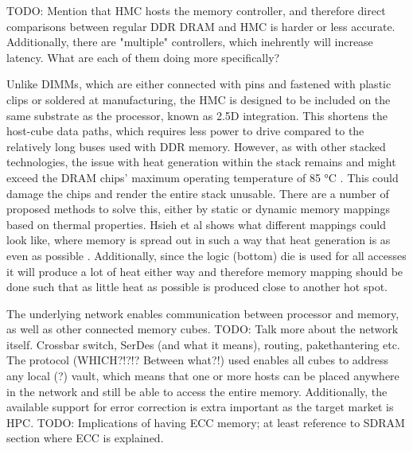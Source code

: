 TODO: Mention that HMC hosts the memory controller, and therefore direct comparisons between regular DDR DRAM and HMC is harder or less accurate. Additionally, there are "multiple" controllers, which inehrently will increase latency. What are each of them doing more specifically?

Unlike DIMMs, which are either connected with pins and fastened with plastic clips or soldered at manufacturing, the HMC is designed to be included on the same substrate as the processor, known as 2.5D integration. This shortens the host-cube data paths, which requires less power to drive compared to the relatively long buses used with DDR memory. However, as with other stacked technologies, the issue with heat generation within the stack remains and might exceed the DRAM chips' maximum operating temperature of 85 °C \cite{7459470}. This could damage the chips and render the entire stack unusable. There are a number of proposed methods to solve this, either by static or dynamic memory mappings based on thermal properties. Hsieh et al shows what different mappings could look like, where memory is spread out in such a way that heat generation is as even as possible \cite{Hsieh:2013:TMM:2501626.2512457}. Additionally, since the logic (bottom) die is used for all accesses it will produce a lot of heat either way and therefore memory mapping should be done such that as little heat as possible is produced close to another hot spot.

The underlying network enables communication between processor and memory, as well as other connected memory cubes. 
TODO: Talk more about the network itself. Crossbar switch, SerDes (and what it means), routing, pakethantering etc. The protocol (WHICH?!?!? Between what?!) used enables all cubes to address any local (?) vault, which means that one or more hosts can be placed anywhere in the network and still be able to access the entire memory. Additionally, the available support for error correction is extra important as the target market is HPC. TODO: Implications of having ECC memory; at least reference to SDRAM section where ECC is explained. 

